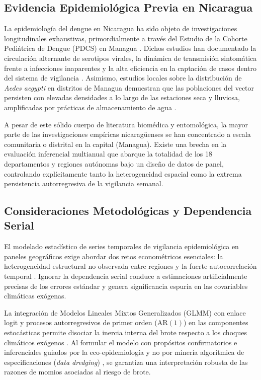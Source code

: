 \documentclass[11pt,a4paper]{article}
\begin{document}
\subsection{Evidencia Epidemiológica Previa en Nicaragua}
La epidemiología del dengue en Nicaragua ha sido objeto de investigaciones longitudinales exhaustivas, primordialmente a través del Estudio de la Cohorte Pediátrica de Dengue (PDCS) en Managua \parencite{gordon2013pediatric, standish2010high}. Dichos estudios han documentado la circulación alternante de serotipos virales, la dinámica de transmisión sintomática frente a infecciones inaparentes y la alta eficiencia en la captación de casos dentro del sistema de vigilancia \parencite{standish2010high}. Asimismo, estudios locales sobre la distribución de \textit{Aedes aegypti} en distritos de Managua demuestran que las poblaciones del vector persisten con elevadas densidades a lo largo de las estaciones seca y lluviosa, amplificadas por prácticas de almacenamiento de agua \parencite{suazo2026abundance}.

A pesar de este sólido cuerpo de literatura biomédica y entomológica, la mayor parte de las investigaciones empíricas nicaragüenses se han concentrado a escala comunitaria o distrital en la capital (Managua). Existe una brecha en la evaluación inferencial multianual que abarque la totalidad de los 18 departamentos y regiones autónomas bajo un diseño de datos de panel, controlando explícitamente tanto la heterogeneidad espacial como la extrema persistencia autorregresiva de la vigilancia semanal.

\subsection{Consideraciones Metodológicas y Dependencia Serial}
El modelado estadístico de series temporales de vigilancia epidemiológica en paneles geográficos exige abordar dos retos econométricos esenciales: la heterogeneidad estructural no observada entre regiones y la fuerte autocorrelación temporal \parencite{zuur2010protocol}. Ignorar la dependencia serial conduce a estimaciones artificialmente precisas de los errores estándar y genera significancia espuria en las covariables climáticas exógenas.

La integración de Modelos Lineales Mixtos Generalizados (GLMM) con enlace logit \parencite{breslow1993approximate, pinheiro2000mixed} y procesos autorregresivos de primer orden ($\text{AR}(1)$) en las componentes estocásticas permite disociar la inercia interna del brote respecto a los choques climáticos exógenos \parencite{diggle2002analysis}. Al formular el modelo con propósitos confirmatorios e inferenciales guiados por la eco-epidemiología y no por minería algorítmica de especificaciones (\textit{data dredging}) \parencite{shmueli2010explain}, se garantiza una interpretación robusta de las razones de momios asociadas al riesgo de brote.
\end{document}
